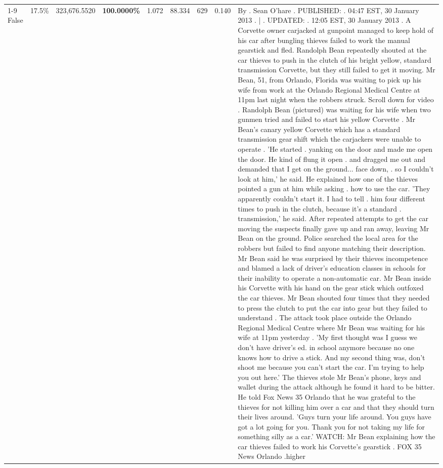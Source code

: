 \begin{table}[H]
\begin{tabular}{lllrlllll}
\cline{1-9} \cline{2-9}
False & 17.5\% & 323,676.5520 & \bfseries \color{red} 100.0000\% & 1.072 & 88.334 & 629 & 0.140 & By . Sean O'hare . PUBLISHED: . 04:47 EST, 30 January 2013 . | . UPDATED: . 12:05 EST, 30 January 2013 . A Corvette owner carjacked at gunpoint managed to keep hold of his car after bungling thieves failed to work the manual gearstick and fled. Randolph Bean repeatedly shouted at the car thieves to push in the clutch of his bright yellow, standard transmission Corvette, but they still failed to get it moving. Mr Bean, 51, from Orlando, Florida was waiting to pick up his wife from work at the Orlando Regional Medical Centre at 11pm last night when the robbers struck. Scroll down for video . Randolph Bean (pictured) was waiting for his wife when two gunmen tried and failed to start his yellow Corvette . Mr Bean's canary yellow Corvette which has a standard transmission gear shift which the carjackers were unable to operate . 'He started . yanking on the door and made me open the door. He kind of flung it open . and dragged me out and demanded that I get on the ground... face down, . so I couldn't look at him,' he said. He explained how one of the thieves pointed a gun at him while asking . how to use the car. 'They apparently couldn't start it. I had to tell . him four different times to push in the clutch, because it's a standard . transmission,' he said. After repeated attempts to get the car moving the suspects finally gave up and ran away, leaving Mr Bean on the ground. Police searched the local area for the robbers but failed to find anyone matching their description. Mr Bean said he was surprised by their thieves incompetence and blamed a lack of driver's education classes in schools for their inability to operate a non-automatic car. Mr Bean inside his Corvette with his hand on the gear stick which outfoxed the car thieves. Mr Bean shouted four times that they needed to press the clutch to put the car into gear but they failed to understand . The attack took place outside the Orlando Regional Medical Centre where Mr Bean was waiting for his wife at 11pm yesterday . 'My first thought was I guess we don't have driver's ed. in school anymore because no one knows how to drive a stick. And my second thing was, don't shoot me because you can't start the car. I'm trying to help you out here.' The thieves stole Mr Bean's phone, keys and wallet during the attack although he found it hard to be bitter. He told Fox News 35 Orlando that he was grateful to the thieves for not killing him over a car and that they should turn their lives around. 'Guys turn your life around. You guys have got a lot going for you. Thank you for not taking my life for something silly as a car.' WATCH: Mr Bean explaining how the car thieves failed to work his Corvette's gearstick . FOX 35 News Orlando .higher \\

\end{tabular}
\end{table}
